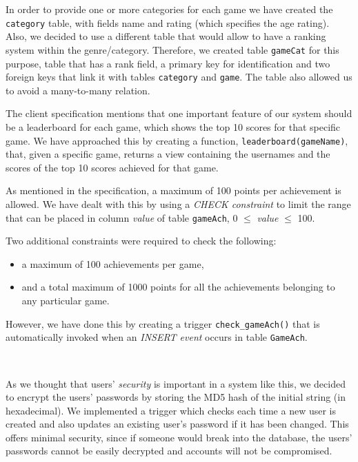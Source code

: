 \documentclass{article}
\begin{document}
\par{In order to provide one or more categories for each game we have created the \texttt{category} table, with fields name and rating (which specifies the age rating). Also, we decided to use a different table that would allow to have a ranking system within the genre/category. Therefore, we created table \texttt{gameCat} for this purpose, table that has a rank field, a primary key for identification and two foreign keys that link it with tables \texttt{category} and \texttt{game}. The table also allowed us to avoid a many-to-many relation.}\\

\par {The client specification mentions that one important feature of our system should be a leaderboard for each game, which shows the top 10 scores for that specific game. We have approached this by creating a function, \texttt{leaderboard(gameName)}, that, given a specific game, returns a view containing the usernames and the scores of the top 10 scores achieved for that game.}\\

\par {As mentioned in the specification, a maximum of 100 points per achievement is allowed. We have dealt with this by using a \emph{CHECK constraint} to limit the range that can be placed in column \emph{value} of table \texttt{gameAch}, 0 $\leq$ \emph{value} $\leq$ 100.}\\

\par {Two additional constraints were required to check the following:
\begin{itemize}[noitemsep, nolistsep]
  \item a maximum of 100 achievements per game,
  \item and a total maximum of 1000 points for all the achievements belonging to any particular game.
\end{itemize}
However, we have done this by creating a trigger \texttt{check\_gameAch()} that is automatically invoked when an \emph{INSERT event} occurs in table \texttt{GameAch}.}\\

\par {As we thought that users' \textsl{security} is important in a system like this, we decided to encrypt the users' passwords by storing the MD5 hash of the initial string (in hexadecimal). We implemented a trigger which checks each time a new user is created and also updates an existing user's password if it has been changed. This offers minimal security, since if someone would break into the database, the users' passwords cannot be easily decrypted and accounts will not be compromised.}\\
\end{document}
